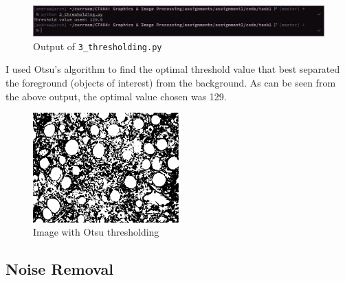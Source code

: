 \documentclass[a4paper]{article}
\newenvironment{code}{\captionsetup{type=listing}}{}
\begin{document}
\begin{figure}[H]
    \centering
    \includegraphics[width=\textwidth]{./images/3_thresholding_output.png}
    \caption{Output of \texttt{3_thresholding.py}}
\end{figure}

I used Otsu's algorithm to find the optimal threshold value that best separated the foreground (objects of interest) from the background.
As can be seen from the above output, the optimal value chosen was 129.

\begin{figure}[H]
    \centering
    \includegraphics[width=0.5\textwidth]{../code/task1/output/otsu.jpg}
    \caption{Image with Otsu thresholding}
\end{figure}

\subsection{Noise Removal}
\begin{code}
    \inputminted[linenos, breaklines, frame=single]{python}{../code/task1/4_noise_removal.py}
    \caption{\texttt{4_noise_removal.py}}
\end{code}
\end{document}
